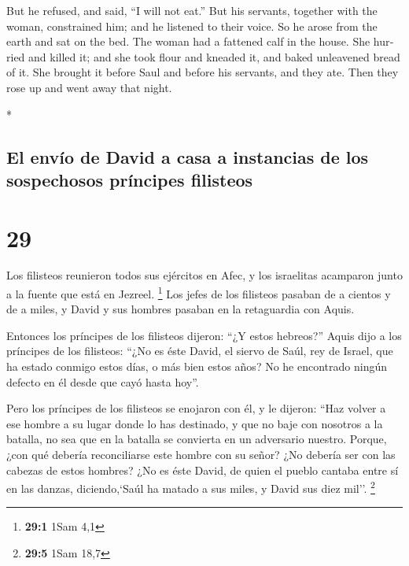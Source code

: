 \begin{paracol}{2}
\begin{otherlanguage}{english}
 But he refused, and said, ``I will not eat.'' But his
servants, together with the woman, constrained him; and he listened to
their voice. So he arose from the earth and sat on the bed.
 The woman had a fattened calf in the house. She hurried
and killed it; and she took flour and kneaded it, and baked unleavened
bread of it.  She brought it before Saul and before his
servants, and they ate. Then they rose up and went away that night.

\end{otherlanguage}

\switchcolumn[0]*

\hypertarget{el-envuxedo-de-david-a-casa-a-instancias-de-los-sospechosos-pruxedncipes-filisteos}{%
\subsection{El envío de David a casa a instancias de los sospechosos
príncipes
filisteos}\label{el-envuxedo-de-david-a-casa-a-instancias-de-los-sospechosos-pruxedncipes-filisteos}}

\hypertarget{section-56}{%
\section{29}\label{section-56}}

 Los filisteos reunieron todos sus ejércitos en Afec, y
los israelitas acamparon junto a la fuente que está en Jezreel.
\footnote{\textbf{29:1} 1Sam 4,1}  Los jefes de los
filisteos pasaban de a cientos y de a miles, y David y sus hombres
pasaban en la retaguardia con Aquis.

 Entonces los príncipes de los filisteos dijeron: ``¿Y
estos hebreos?'' Aquis dijo a los príncipes de los filisteos: ``¿No es
éste David, el siervo de Saúl, rey de Israel, que ha estado conmigo
estos días, o más bien estos años? No he encontrado ningún defecto en él
desde que cayó hasta hoy''.

 Pero los príncipes de los filisteos se enojaron con él, y
le dijeron: ``Haz volver a ese hombre a su lugar donde lo has destinado,
y que no baje con nosotros a la batalla, no sea que en la batalla se
convierta en un adversario nuestro. Porque, ¿con qué debería
reconciliarse este hombre con su señor? ¿No debería ser con las cabezas
de estos hombres?  ¿No es éste David, de quien el pueblo
cantaba entre sí en las danzas, diciendo,`Saúl ha matado a sus miles, y
David sus diez mil''. \footnote{\textbf{29:5} 1Sam 18,7}


\end{paracol}
